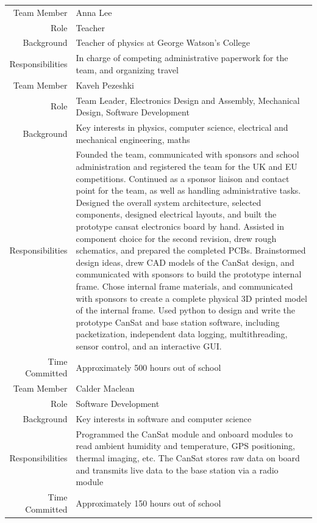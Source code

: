 \documentclass[]{report}
\begin{document}
	\begin{center}
		\begin{longtable}{rp{13cm}}		
			Team Member&Anna Lee \\
			Role&Teacher \\
			Background&Teacher of physics at George Watson's College \\
			Responsibilities&In charge of competing administrative paperwork for the team, and organizing travel\\
			\hline
			Team Member&Kaveh Pezeshki \\
			Role&Team Leader, Electronics Design and Assembly, Mechanical Design, Software Development \\
			Background&Key interests in physics, computer science, electrical and mechanical engineering, maths \\
			Responsibilities&Founded the team, communicated with sponsors and school administration and registered the team for the UK and EU competitions. Continued as a sponsor liaison and contact point for the team, as well as handling administrative tasks. Designed the overall system architecture, selected components, designed electrical layouts, and built the prototype cansat electronics board by hand. Assisted in component choice for the second revision, drew rough schematics, and prepared the completed PCBs. Brainstormed design ideas, drew CAD models of the CanSat design, and communicated with sponsors to build the prototype internal frame. Chose internal frame materials, and communicated with sponsors to create a complete physical 3D printed model of the internal frame. Used python to design and write the prototype CanSat and base station software, including packetization, independent data logging, multithreading, sensor control, and an interactive GUI.
			\\
			Time Committed&Approximately 500 hours out of school\\
			\hline
			Team Member&Calder Maclean \\
			Role&Software Development \\
			Background&Key interests in software and computer science \\
			Responsibilities&Programmed the CanSat module and onboard modules to read ambient humidity and temperature, GPS positioning, thermal imaging, etc. The CanSat stores raw data on board and transmits live data to the base station via a radio module\\
			Time Committed&Approximately 150 hours out of school\\

\end{longtable}
\end{center}
\end{document}
